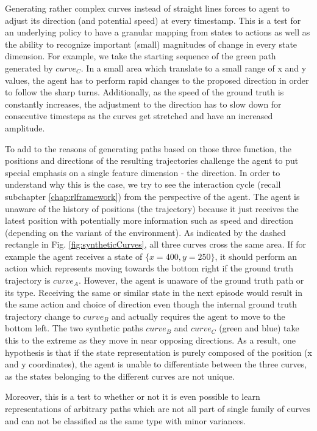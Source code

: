 Generating rather complex curves instead of straight lines forces to agent to adjust its direction (and potential speed) at every timestamp. This is a test for an underlying policy to have a granular mapping from states to actions as well as the ability to recognize important (small) magnitudes of change in every state dimension. For example, we take the starting sequence of the green path generated by $curve_C$. In a small area which translate to a small range of x and y values, the agent has to perform rapid changes to the proposed direction in order to follow the sharp turns. Additionally, as the speed of the ground truth is constantly increases, the adjustment to the direction has to slow down for consecutive timesteps as the curves get stretched and have an increased amplitude.
\par
To add to the reasons of generating paths based on those three function, the positions and directions of the resulting trajectories challenge the agent to put special emphasis on a single feature dimension - the direction.  In order to understand why this is the case, we try to see the interaction cycle (recall subchapter \ref{chap:rlframework}) from the perspective of the agent. The agent is unaware of the history of positions (the trajectory) because it just receives the latest position with potentially more information such as speed and direction (depending on the variant of the environment). As indicated by the dashed rectangle in Fig. \ref{fig:syntheticCurves}, all three curves cross the same area. If for example the agent receives a state of $\{x=400, y=250\}$, it should perform an action which represents moving towards the bottom right if the ground truth trajectory is $curve_A$. However, the agent is unaware of the ground truth path or its type. Receiving the same or similar state in the next episode would result in the same action and choice of direction even though the internal ground truth trajectory change to $curve_B$ and actually requires the agent to move to the bottom left. The two synthetic paths $curve_B$ and $curve_C$ (green and blue) take this to the extreme as they move in near opposing directions. As a result, one hypothesis is that if the state representation is purely composed of the position (x and y coordinates), the agent is unable to differentiate between the three curves, as the states belonging to the different curves are not unique.
\par
Moreover, this is a test to whether or not it is even possible to learn representations of arbitrary paths which are not all part of single family of curves and can not be classified as the same type with minor variances.
